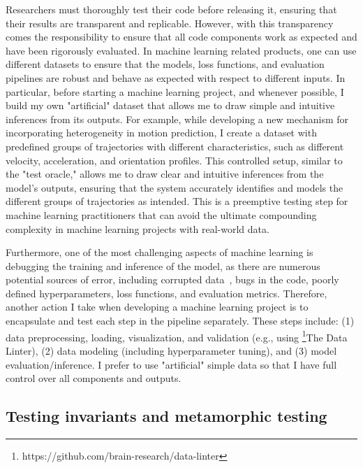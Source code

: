 \documentclass{article}
\begin{document}
Researchers must thoroughly test their code before releasing it, ensuring that their results are transparent and replicable. However, with this transparency comes the responsibility to ensure that all code components work as expected and have been rigorously evaluated. In machine learning related products, one can use different datasets to ensure that the models, loss functions, and evaluation pipelines are robust and behave as expected with respect to different inputs. In particular, before starting a machine learning project, and whenever possible, I build my own "artificial" dataset that allows me to draw simple and intuitive inferences from its outputs.
For example, while developing a new mechanism for incorporating heterogeneity in motion prediction, I create a dataset with predefined groups of trajectories with different characteristics, such as different velocity, acceleration, and orientation profiles. This controlled setup, similar to the "test oracle," allows me to draw clear and intuitive inferences from the model's outputs, ensuring that the system accurately identifies and models the different groups of trajectories as intended. This is a preemptive testing step for machine learning practitioners that can avoid the ultimate compounding complexity in machine learning projects with real-world data. 

Furthermore, one of the most challenging aspects of machine learning is debugging the training and inference of the model, as there are numerous potential sources of error, including corrupted data~\cite{nascimento19}, bugs in the code, poorly defined hyperparameters, loss functions, and evaluation metrics. Therefore, another action I take when developing a machine learning project is to encapsulate and test each step in the pipeline separately. These steps include: (1) data preprocessing, loading, visualization, and validation (e.g., using \footnote{https://github.com/brain-research/data-linter}{The Data Linter}), (2) data modeling (including hyperparameter tuning), and (3) model evaluation/inference. I prefer to use "artificial" simple data so that I have full control over all components and outputs.


\subsection{Testing invariants and metamorphic testing}
\end{document}
